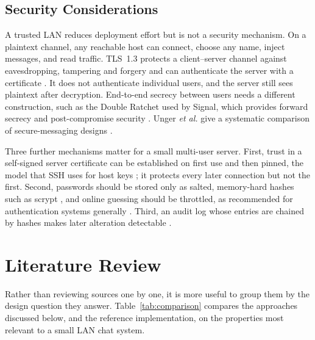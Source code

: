 \documentclass[conference]{IEEEtran}
\begin{document}
\subsection{Security Considerations}
A trusted LAN reduces deployment effort but is not a security mechanism. On a plaintext channel, any reachable host can connect, choose any name, inject messages, and read traffic. TLS~1.3 protects a client--server channel against eavesdropping, tampering and forgery and can authenticate the server with a certificate \cite{rfc8446}. It does not authenticate individual users, and the server still sees plaintext after decryption. End-to-end secrecy between users needs a different construction, such as the Double Ratchet used by Signal, which provides forward secrecy and post-compromise security \cite{signal,cohngordon}. Unger \emph{et al.} give a systematic comparison of secure-messaging designs \cite{unger}.

Three further mechanisms matter for a small multi-user server. First, trust in a self-signed server certificate can be established on first use and then pinned, the model that SSH uses for host keys \cite{rfc4251}; it protects every later connection but not the first. Second, passwords should be stored only as salted, memory-hard hashes such as scrypt \cite{rfc7914}, and online guessing should be throttled, as recommended for authentication systems generally \cite{nist63b}. Third, an audit log whose entries are chained by hashes makes later alteration detectable \cite{schneier99,crosby09}.

\section{Literature Review}
Rather than reviewing sources one by one, it is more useful to group them by the design question they answer. Table~\ref{tab:comparison} compares the approaches discussed below, and the reference implementation, on the properties most relevant to a small LAN chat system.
\end{document}
